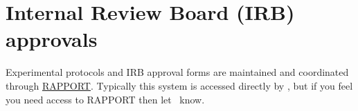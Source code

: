 \documentclass{tufte-book} %
\begin{document}












\chapter{Internal Review Board (IRB) approvals}\label{ch:irb}
Experimental  protocols and IRB approval forms are maintained and
coordinated through
\href{https://rapport.dartmouth.edu/}{RAPPORT}.  Typically this system
is accessed directly by \director, but if you feel you
need access to RAPPORT then let \director~know.
\end{document}
